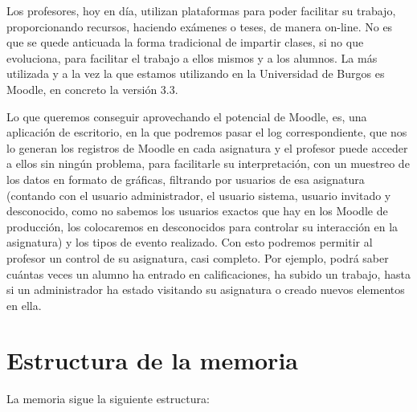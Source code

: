 
Los profesores, hoy en día, utilizan plataformas para poder facilitar su trabajo, proporcionando recursos, haciendo exámenes o teses, de manera on-line. No es que se quede anticuada la forma tradicional de impartir clases, si no que evoluciona, para facilitar el trabajo a ellos mismos y a los alumnos.
La más utilizada y a la vez la que estamos utilizando en la Universidad de Burgos es Moodle, en concreto la versión 3.3.




Lo que queremos conseguir aprovechando el potencial de Moodle, es, una aplicación de escritorio, en la que podremos pasar el log correspondiente, que nos lo generan los registros de Moodle en cada asignatura y el profesor puede acceder a ellos sin ningún problema, para facilitarle su interpretación, con un muestreo de los datos en formato de gráficas, filtrando por usuarios de esa asignatura (contando con el usuario administrador, el usuario sistema, usuario invitado y desconocido, como no sabemos los usuarios exactos que hay en los Moodle de producción, los colocaremos en desconocidos para controlar su interacción en la asignatura) y los tipos de evento realizado. 
Con esto podremos permitir al profesor un control de su asignatura, casi completo. Por ejemplo, podrá saber cuántas veces un alumno ha entrado en calificaciones, ha subido un trabajo, hasta si un administrador ha estado visitando su asignatura o creado nuevos elementos en ella.


\section{Estructura de la memoria}\label{estructura-de-la-memoria}

La memoria sigue la siguiente estructura:

